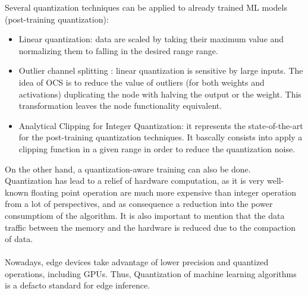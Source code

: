 Several quantization techniques can be applied to already trained ML models (post-training quantization):
\begin{itemize}
\item Linear quantization: data are scaled by taking their maximum value and normalizing them to falling in the desired range range. 
\item Outlier channel splitting\cite{paper:46} : linear quantization is sensitive by large inputs. The idea of OCS is
to reduce the value of outliers (for both weights and activations) duplicating the node with halving the output or the weight. This transformation leaves the node functionality equivalent.
\item Analytical Clipping for Integer Quantization\cite{paper:47}: it represents the state-of-the-art for the post-training quantization techniques. It bascally consists into apply a clipping function in a given range in order to reduce the quantization noise.
\end{itemize}

On the other hand, a quantization-aware training can also be done\cite{paper:45}.\\
Quantization has lead to a relief of hardware computation, as it is very well-known floating point operation are much more expensive than integer operation from a lot of perspectives, and as consequence a reduction into the power consumptiom of the algorithm. It is also important to mention that the data traffic between the memory and the hardware is reduced due to the compaction of data.\\\\

Nowadays, edge devices take advantage of lower precision and quantized operations, including GPUs. Thus, Quantization of machine learning algorithms is a defacto standard for edge inference.

